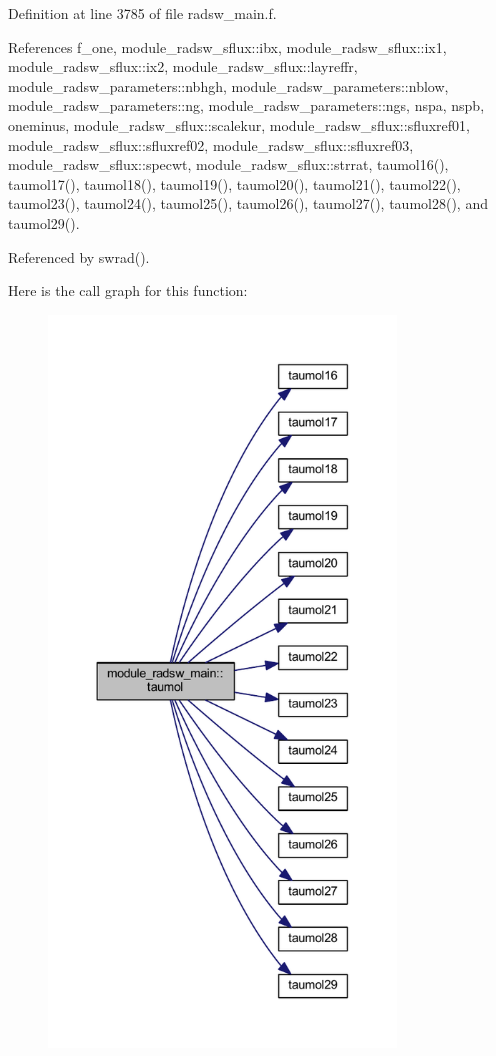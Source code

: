 Definition at line 3785 of file radsw\+\_\+main.\+f.



References f\+\_\+one, module\+\_\+radsw\+\_\+sflux\+::ibx, module\+\_\+radsw\+\_\+sflux\+::ix1, module\+\_\+radsw\+\_\+sflux\+::ix2, module\+\_\+radsw\+\_\+sflux\+::layreffr, module\+\_\+radsw\+\_\+parameters\+::nbhgh, module\+\_\+radsw\+\_\+parameters\+::nblow, module\+\_\+radsw\+\_\+parameters\+::ng, module\+\_\+radsw\+\_\+parameters\+::ngs, nspa, nspb, oneminus, module\+\_\+radsw\+\_\+sflux\+::scalekur, module\+\_\+radsw\+\_\+sflux\+::sfluxref01, module\+\_\+radsw\+\_\+sflux\+::sfluxref02, module\+\_\+radsw\+\_\+sflux\+::sfluxref03, module\+\_\+radsw\+\_\+sflux\+::specwt, module\+\_\+radsw\+\_\+sflux\+::strrat, taumol16(), taumol17(), taumol18(), taumol19(), taumol20(), taumol21(), taumol22(), taumol23(), taumol24(), taumol25(), taumol26(), taumol27(), taumol28(), and taumol29().



Referenced by swrad().



Here is the call graph for this function\+:\nopagebreak
\begin{figure}[H]
\begin{center}
\leavevmode
\includegraphics[height=550pt]{namespacemodule__radsw__main_afbfb76d4fab10254e065dce350ae5f2b_cgraph}
\end{center}
\end{figure}




